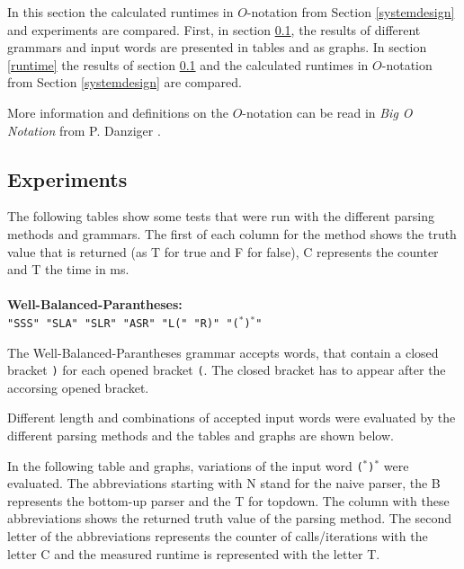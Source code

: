 \documentclass[a4paper, 11pt]{article}
\begin{document}
In this section the calculated runtimes in $O$-notation from Section \ref{systemdesign} and experiments are compared. 
First, in section \ref{experiments}, the results of different grammars and input words are presented in tables and as graphs.
In section \ref{runtime} the results of section \ref{experiments} and the calculated runtimes in $O$-notation from Section \ref{systemdesign} are compared.

More information and definitions on the $O$-notation can be read in \textit{Big O Notation} from P. Danziger \cite{bigO}.


\subsection{Experiments}
\label{experiments}

The following tables show some tests that were run with the different parsing methods and grammars. The first of each column for the method shows the truth value that is returned (as T for true and F for false), C represents the counter and T the time in ms.
\\
\\
\textbf{Well-Balanced-Parantheses:} \\
\texttt{"SSS" "SLA" "SLR" "ASR" "L(" "R)" "($^*$)$^*$"}

The Well-Balanced-Parantheses grammar accepts words, that contain a closed bracket \texttt{)} for each opened bracket \texttt{(}. The closed bracket has to appear after the accorsing opened bracket.

Different length and combinations of accepted input words were evaluated by the different parsing methods and the tables and graphs are shown below.

In the following table and graphs, variations of the input word \texttt{($^*$)$^*$} were evaluated. The abbreviations starting with N stand for the naive parser, the B represents the bottom-up parser and the T for topdown. The column with these abbreviations shows the returned truth value of the parsing method. The second letter of the abbreviations represents the counter of calls/iterations with the letter C and the measured runtime is represented with the letter T.
\end{document}
